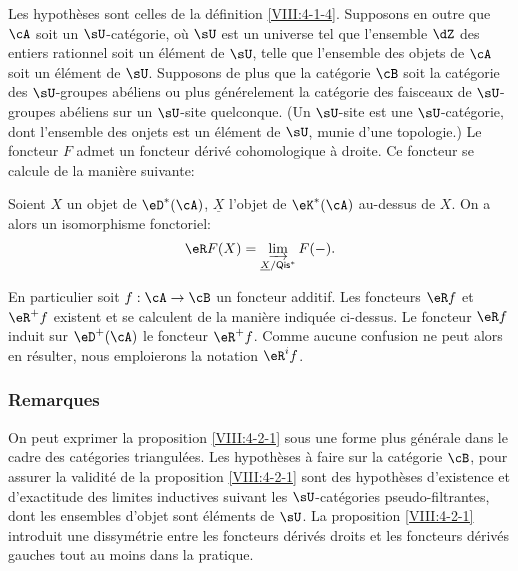 \begin{proposition}\label{VIII:4-2-1}
Les hypothèses sont celles de la définition \ref{VIII:4-1-4}. Supposons 
en outre que $\cA$ soit un $\sU$-catégorie, où $\sU$ est un universe tel 
que l'ensemble $\dZ$ des entiers rationnel soit un élément de $\sU$, telle 
que l'ensemble des objets de $\cA$ soit un élément de $\sU$. Supposons 
de plus que la catégorie $\cB$ soit la catégorie des $\sU$-groupes 
abéliens ou plus générelement la catégorie des faisceaux de 
$\sU$-groupes abéliens sur un $\sU$-site quelconque. (Un $\sU$-site est une 
$\sU$-catégorie, dont l'ensemble des onjets est un élément de $\sU$, 
munie d'une topologie.) Le foncteur $F$ admet un foncteur dérivé 
cohomologique à droite. Ce foncteur se calcule de la manière suivante: 

Soient $X$ un objet de $\eD^\ast(\cA)$, $\underline X$ l'objet de 
$\eK^\ast(\cA)$ au-dessus de $X$. On a alors un isomorphisme fonctoriel: 
\[
  \eR F(X) = \varinjlim_{\underline X/\mathsf{Qis}^\ast} F(-) \text{.}
\]
\end{proposition}

En particulier soit $f:\cA\to \cB$ un foncteur additif. Les foncteurs 
$\eR f$ et $\eR^+ f$ existent et se calculent de la manière indiquée 
ci-dessus. Le foncteur $\eR f$ induit sur $\eD^+(\cA)$ le foncteur 
$\eR^+ f$. Comme aucune confusion ne peut alors en résulter, nous 
emploierons la notation $\eR^i f$. 





\subsubsection{Remarques}\label{VIII:4-2-2}

On peut exprimer la proposition \ref{VIII:4-2-1} sous une forme plus 
générale dans le cadre des catégories triangulées. Les hypothèses 
à faire sur la catégorie $\cB$, pour assurer la validité de la 
proposition \ref{VIII:4-2-1} sont des hypothèses d'existence et d'exactitude 
des limites inductives suivant les $\sU$-catégories pseudo-filtrantes, dont 
les ensembles d'objet sont éléments de $\sU$. La proposition 
\ref{VIII:4-2-1} introduit une dissymétrie entre les foncteurs dérivés 
droits et les foncteurs dérivés gauches tout au moins dans la pratique. 





